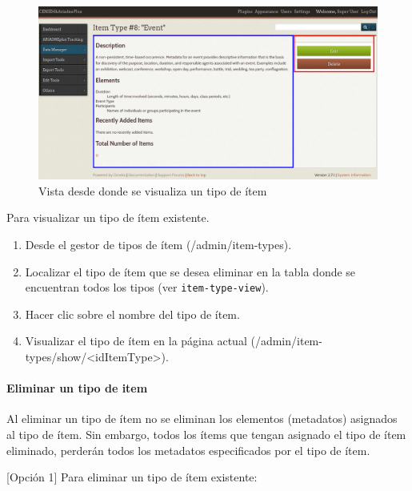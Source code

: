 \documentclass[
]{article}
\providecommand{\tightlist}{%
  \setlength{\itemsep}{0pt}\setlength{\parskip}{0pt}}
\begin{document}
\begin{figure}
\hypertarget{show-item-type}{%
\centering
\includegraphics{../_static/images/show-item-type.png}
\caption{Vista desde donde se visualiza un tipo de
ítem}\label{show-item-type}
}
\end{figure}

Para visualizar un tipo de ítem existente.

\begin{enumerate}
\def\labelenumi{\arabic{enumi}.}
\tightlist
\item
  Desde el gestor de tipos de ítem ({/admin/item-types}).
\item
  Localizar el tipo de ítem que se desea eliminar en la tabla donde se
  encuentran todos los tipos (ver \texttt{item-type-view}).
\item
  Hacer clic sobre el nombre del tipo de ítem.
\item
  Visualizar el tipo de ítem en la página actual
  ({/admin/item-types/show/\textless idItemType\textgreater{}}).
\end{enumerate}

\hypertarget{eliminar-un-tipo-de-item}{%
\paragraph{Eliminar un tipo de item}\label{eliminar-un-tipo-de-item}}

Al eliminar un tipo de ítem no se eliminan los elementos (metadatos)
asignados al tipo de ítem. Sin embargo, todos los ítems que tengan
asignado el tipo de ítem eliminado, perderán todos los metadatos
especificados por el tipo de ítem.

{[}Opción 1{]} Para eliminar un tipo de ítem existente:
\end{document}
